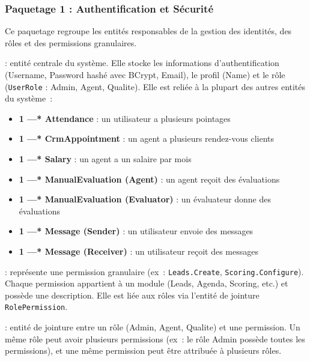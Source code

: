 \subsubsection{Paquetage 1 : Authentification et Sécurité}

Ce paquetage regroupe les entités responsables de la gestion des identités, des rôles
et des permissions granulaires.

\begin{description}[itemsep=4pt]
    \item[\textbf{User}] : entité centrale du système. Elle stocke les informations
    d'authentification (Username, Password hashé avec BCrypt, Email), le profil (Name)
    et le rôle (\texttt{UserRole} : Admin, Agent, Qualite). Elle est reliée à la plupart
    des autres entités du système~:
    \begin{itemize}
        \item \textbf{1 ---* Attendance} : un utilisateur a plusieurs pointages
        \item \textbf{1 ---* CrmAppointment} : un agent a plusieurs rendez-vous clients
        \item \textbf{1 ---* Salary} : un agent a un salaire par mois
        \item \textbf{1 ---* ManualEvaluation (Agent)} : un agent reçoit des évaluations
        \item \textbf{1 ---* ManualEvaluation (Evaluator)} : un évaluateur donne des évaluations
        \item \textbf{1 ---* Message (Sender)} : un utilisateur envoie des messages
        \item \textbf{1 ---* Message (Receiver)} : un utilisateur reçoit des messages
    \end{itemize}

    \item[\textbf{Permission}] : représente une permission granulaire (ex~: \texttt{Leads.Create},
    \texttt{Scoring.Configure}). Chaque permission appartient à un module (Leads, Agenda,
    Scoring, etc.) et possède une description. Elle est liée aux rôles via l'entité de
    jointure \texttt{RolePermission}.

    \item[\textbf{RolePermission}] : entité de jointure entre un rôle (Admin, Agent, Qualite)
    et une permission. Un même rôle peut avoir plusieurs permissions (ex~: le rôle Admin
    possède toutes les permissions), et une même permission peut être attribuée à
    plusieurs rôles.
\end{description}

